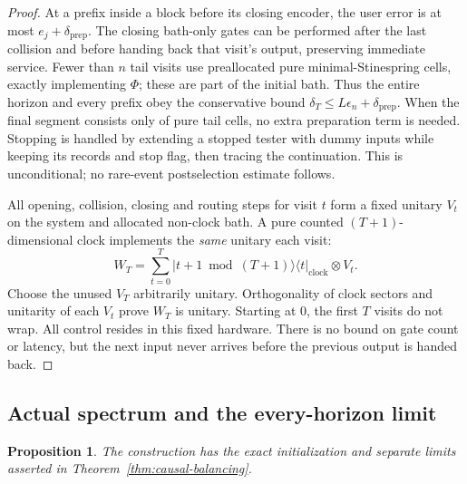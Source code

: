 \documentclass[11pt,a4paper]{article}
\numberwithin{equation}{section}
\theoremstyle{plain}
\newtheorem{proposition}[theorem]{Proposition}
\theoremstyle{definition}
\newcommand{\ketbra}[2]{\lvert #1 \rangle\langle #2 \rvert}
\begin{document}
\begin{proof}
At a prefix inside a block before its closing encoder, the user error is at
most $e_j+\delta_{\mathrm{prep}}$. The closing bath-only gates can be
performed after the last collision and before handing back that visit's
output, preserving immediate service. Fewer than $n$ tail visits use
preallocated pure minimal-Stinespring cells, exactly implementing $\Phi$;
these are part of the initial bath. Thus the entire horizon and every prefix
obey the conservative bound
$\delta_T\le L\epsilon_n+\delta_{\mathrm{prep}}$. When the final segment
consists only of pure tail cells, no extra preparation term is needed.
Stopping is handled by extending a stopped tester with dummy inputs while
keeping its records and stop flag, then tracing the continuation. This is
unconditional; no rare-event postselection estimate follows.

All opening, collision, closing and routing steps for visit $t$ form a fixed
unitary $V_t$ on the system and allocated non-clock bath. A pure counted
$(T+1)$-dimensional clock implements the \emph{same} unitary each visit:
\begin{equation}
\label{eq:repeated-unitary}
W_T=\sum_{t=0}^{T}\ketbra{t+1\bmod (T+1)}{t}_{\mathrm{clock}}\otimes V_t .
\end{equation}
Choose the unused $V_T$ arbitrarily unitary. Orthogonality of clock sectors
and unitarity of each $V_t$ prove $W_T$ is unitary. Starting at $0$, the first
$T$ visits do not wrap. All control resides in this fixed hardware. There is
no bound on gate count or latency, but the next input never arrives before the
previous output is handed back.
\end{proof}

\subsection{Actual spectrum and the every-horizon limit}

\begin{proposition}
\label{prop:actual-spectrum}
The construction has the exact initialization and separate limits asserted in
Theorem~\ref{thm:causal-balancing}.
\end{proposition}
\end{document}

